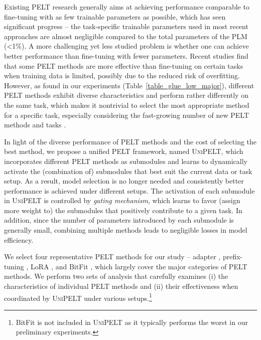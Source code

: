 Existing PELT research generally aims at achieving performance comparable to fine-tuning with as few trainable parameters as possible, which has seen significant progress -- the task-specific trainable parameters used in most recent approaches \cite{lester2021power,guo-etal-2021-parameter} are almost negligible compared to the total parameters of the PLM (<1\%).
A more challenging yet less studied problem is whether one can achieve better performance than fine-tuning with fewer parameters. Recent studies \cite{he-etal-2021-effectiveness,li-liang-2021-prefix,karimi-mahabadi-etal-2021-parameter} find that some PELT methods are more effective than fine-tuning on certain tasks when training data is limited, possibly due to the reduced risk of overfitting. However, as found in our experiments (Table~\ref{table_glue_low_major}), different PELT methods  exhibit diverse characteristics and perform rather differently on the same task, which makes it nontrivial to select the most appropriate method for a specific task, especially considering the fast-growing number of new PELT methods and tasks \cite{pelt_github}.

In light of the diverse performance of PELT methods and the cost of selecting the best method, we propose a unified PELT framework, named \textsc{UniPELT}, which incorporates different PELT methods as submodules and learns to dynamically activate the (combination of) submodules that best suit the current data or task setup. As a result, model selection is no longer needed and consistently better performance is achieved under different setups. The activation of each submodule in \textsc{UniPELT} is controlled by \textit{gating mechanism}, which learns to favor (assign more weight to) the submodules that positively contribute to a given task. In addition, since the number of parameters introduced by each submodule is generally small, combining multiple methods leads to negligible losses in model efficiency.

We select four representative PELT methods for our study -- adapter \cite{houlsby2019parameter}, prefix-tuning \cite{li-liang-2021-prefix}, LoRA \cite{hu2021lora}, and BitFit \cite{ben2021bitfit}, which largely cover the major categories of PELT methods. We perform two sets of analysis that carefully examines (i) the characteristics of individual PELT methods and (ii) their effectiveness when coordinated by \textsc{UniPELT} under various setups.\footnote{BitFit is not included in \textsc{UniPELT} as it typically performs the worst in our preliminary experiments.}

